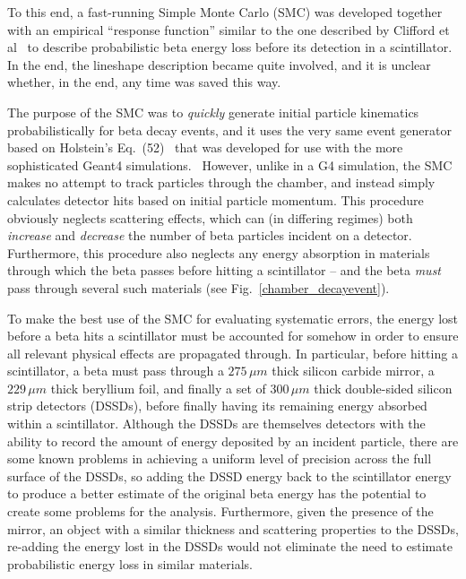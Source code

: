 To this end, a fast-running Simple Monte Carlo (SMC) was developed together with an empirical ``response function'' similar to the one described by Clifford et al~\cite{clifford} to describe probabilistic beta energy loss before its detection in a scintillator.  In the end, the lineshape description became quite involved, and it is unclear whether, in the end, any time was saved this way. 

The purpose of the SMC was to \emph{quickly} generate initial particle kinematics probabilistically for beta decay events, and it uses the very same event generator based on Holstein's Eq.~(52)~\cite{holstein} that was developed for use with the more sophisticated Geant4 simulations.~  However, unlike in a G4 simulation, the SMC makes no attempt to track particles through the chamber, and instead simply calculates detector hits based on initial particle momentum.  This procedure obviously neglects scattering effects, which can (in differing regimes) both \emph{increase} and \emph{decrease} the number of beta particles incident on a detector.  Furthermore, this procedure also neglects any energy absorption in materials through which the beta passes before hitting a scintillator -- and the beta \emph{must} pass through several such materials (see Fig.~\ref{chamber_decayevent}).

To make the best use of the SMC for evaluating systematic errors, the energy lost before a beta hits a scintillator must be accounted for somehow in order to ensure all relevant physical effects are propagated through.  In particular, before hitting a scintillator, a beta must pass through a $275\,\mu m$ thick silicon carbide mirror, a $229\,\mu m$ thick beryllium foil, %
and finally a set of $300\,\mu m$ thick double-sided silicon strip detectors (DSSDs), before finally having its remaining energy absorbed within a scintillator.  Although the DSSDs are themselves detectors with the ability to record the amount of energy deposited by an incident particle, there are some known problems in achieving a uniform level of precision across the full surface of the DSSDs, so adding the DSSD energy back to the scintillator energy to produce a better estimate of the original beta energy has the potential to create some problems for the analysis.  Furthermore, given the presence of the mirror, an object with a similar thickness and scattering properties to the DSSDs, re-adding the energy lost in the DSSDs would not eliminate the need to estimate probabilistic energy loss in similar materials.  


